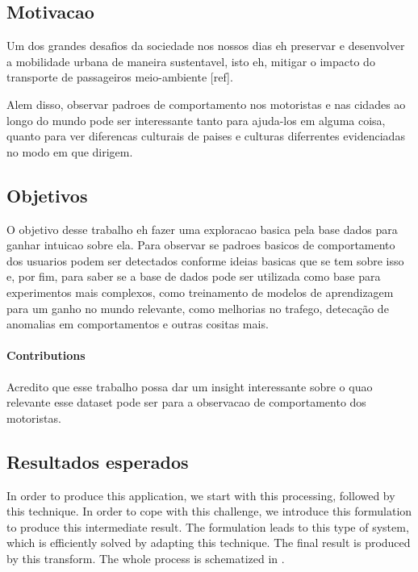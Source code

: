 \documentclass[10pt, conference]{IEEEtran}
\begin{document}
\subsection{Motivacao}
%
Um dos grandes desafios da sociedade nos nossos dias eh preservar
e desenvolver a mobilidade urbana de maneira sustentavel, isto eh,
mitigar o impacto do transporte de passageiros meio-ambiente [ref].

Alem disso, observar padroes de comportamento nos motoristas e nas
cidades ao longo do mundo pode ser interessante tanto para ajuda-los
em alguma coisa, quanto para ver diferencas culturais de paises e 
culturas diferrentes evidenciadas no modo em que dirigem.


\subsection{Objetivos}
%
O objetivo desse trabalho eh fazer uma exploracao basica pela base dados
para ganhar intuicao sobre ela. Para observar se padroes basicos de 
comportamento dos usuarios podem ser detectados conforme ideias
basicas que se tem sobre isso e, por fim, para saber se a base de dados
pode ser utilizada como base para experimentos mais complexos, como 
treinamento de modelos de aprendizagem para um ganho no mundo relevante,
como melhorias no trafego, detecação de anomalias em comportamentos 
e outras cositas mais. 

\paragraph*{Contributions}
%
Acredito que esse trabalho possa dar um insight interessante sobre
o quao relevante esse dataset pode ser para a observacao de comportamento
dos motoristas.



\subsection{Resultados esperados}
%
In order to produce this application, we start with this processing, followed by this technique. In order to cope with this challenge, we introduce this formulation to produce this intermediate result. The formulation leads to this type of system, which is efficiently solved by adapting this technique. The final result is produced by this transform. The whole process is schematized in .
\end{document}
